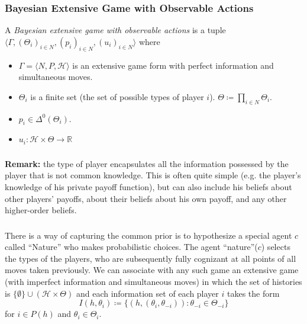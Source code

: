 \documentclass[UTF8,11pt,colorlinks,compress,openany]{beamer}%
\begin{document}
\begin{frame}\frametitle{Bayesian Extensive Game with Observable Actions}
\begin{definition}
	A \emph{Bayesian extensive game with observable actions} is a tuple
	$\langle\Gamma,(\Theta_i)_{i\in N},(p_i)_{i\in N},(u_i)_{i\in N}\rangle$ where
	\begin{itemize}
		\item $\Gamma=\langle N,P,\mathcal{H}\rangle$ is an extensive game form with perfect information and simultaneous moves.
		\item $\Theta_i$ is a finite set (the set of possible types of player $i$). $\Theta\coloneqq \prod\limits_{i\in N}\Theta_i$.
		\item $p_i\in\Delta^0(\Theta_i)$.
		\item $u_i: \mathcal{H}\times\Theta\to\mathbb R$
	\end{itemize}
\end{definition}
\end{frame}

\begin{frame}\frametitle{}
\textbf{Remark:} the type of player encapsulates all the information possessed by the player that is not common knowledge. This is often quite simple (e.g. the player's knowledge of his private payoff function), but can also include his beliefs about other players' payoffs, about their beliefs about his own payoff, and any other higher-order beliefs.
\end{frame}

\begin{frame}\frametitle{}
There is a way of capturing the common prior is to hypothesize a special agent $c$ called ``Nature'' who makes probabilistic choices.
The agent ``nature''($c$) selects the types of the players, who are subsequently fully cognizant at all points of all moves taken previously. We can associate with any such game an extensive game (with imperfect information and simultaneous moves) in which the set of histories is $\{\emptyset\}\cup(\mathcal{H}\times\Theta)$ and each information set of each player $i$ takes the form
\[I(h,\theta_i)\coloneqq \{(h,(\theta_i,\theta_{-i})):\theta_{-i}\in\Theta_{-i}\}\]
for $i\in P(h)$ and $\theta_i\in\Theta_i$.
\end{frame}
\end{document}
